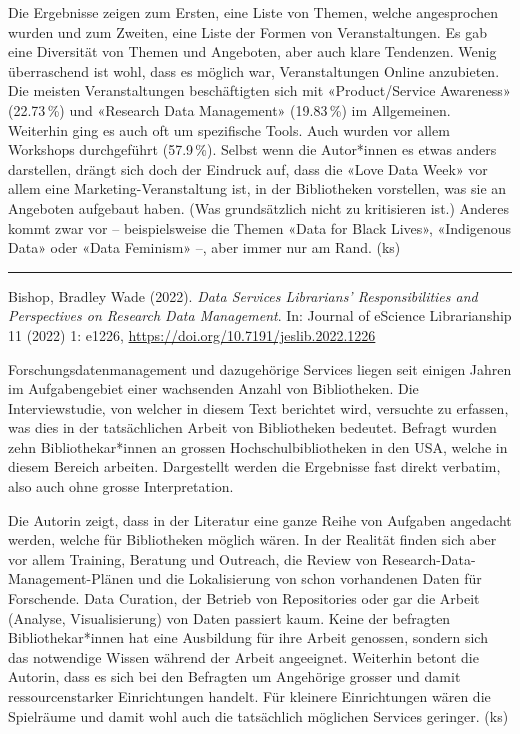 \documentclass[a4paper,
fontsize=11pt,
oneside,
numbers=noperiodatend,
parskip=half-,
bibliography=totoc,
final
]{scrartcl}
\begin{document}
Die Ergebnisse zeigen zum Ersten, eine Liste von Themen, welche
angesprochen wurden und zum Zweiten, eine Liste der Formen von
Veranstaltungen. Es gab eine Diversität von Themen und Angeboten, aber
auch klare Tendenzen. Wenig überraschend ist wohl, dass es möglich war,
Veranstaltungen Online anzubieten. Die meisten Veranstaltungen
beschäftigten sich mit «Product/Service Awareness» (22.73\,\%) und
«Research Data Management» (19.83\,\%) im Allgemeinen. Weiterhin ging es
auch oft um spezifische Tools. Auch wurden vor allem Workshops
durchgeführt (57.9\,\%). Selbst wenn die Autor*innen es etwas anders
darstellen, drängt sich doch der Eindruck auf, dass die «Love Data Week»
vor allem eine Marketing-Veranstaltung ist, in der Bibliotheken
vorstellen, was sie an Angeboten aufgebaut haben. (Was grundsätzlich
nicht zu kritisieren ist.) Anderes kommt zwar vor -- beispielsweise die
Themen «Data for Black Lives», «Indigenous Data» oder «Data Feminism»
--, aber immer nur am Rand. (ks)

\begin{center}\rule{0.5\linewidth}{0.5pt}\end{center}

Bishop, Bradley Wade (2022). \emph{Data Services Librarians'
Responsibilities and Perspectives on Research Data Management}. In:
Journal of eScience Librarianship 11 (2022) 1: e1226,
\url{https://doi.org/10.7191/jeslib.2022.1226}

Forschungsdatenmanagement und dazugehörige Services liegen seit einigen
Jahren im Aufgabengebiet einer wachsenden Anzahl von Bibliotheken. Die
Interviewstudie, von welcher in diesem Text berichtet wird, versuchte zu
erfassen, was dies in der tatsächlichen Arbeit von Bibliotheken
bedeutet. Befragt wurden zehn Bibliothekar*innen an grossen
Hochschulbibliotheken in den USA, welche in diesem Bereich arbeiten.
Dargestellt werden die Ergebnisse fast direkt verbatim, also auch ohne
grosse Interpretation.

Die Autorin zeigt, dass in der Literatur eine ganze Reihe von Aufgaben
angedacht werden, welche für Bibliotheken möglich wären. In der Realität
finden sich aber vor allem Training, Beratung und Outreach, die Review
von Research-Data-Management-Plänen und die Lokalisierung von schon
vorhandenen Daten für Forschende. Data Curation, der Betrieb von
Repositories oder gar die Arbeit (Analyse, Visualisierung) von Daten
passiert kaum. Keine der befragten Bibliothekar*innen hat eine
Ausbildung für ihre Arbeit genossen, sondern sich das notwendige Wissen
während der Arbeit angeeignet. Weiterhin betont die Autorin, dass es
sich bei den Befragten um Angehörige grosser und damit ressourcenstarker
Einrichtungen handelt. Für kleinere Einrichtungen wären die Spielräume
und damit wohl auch die tatsächlich möglichen Services geringer. (ks)
\end{document}
